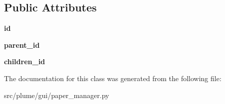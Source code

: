 \subsection*{Public Attributes}
\begin{DoxyCompactItemize}
\item 
{\bfseries id}\hypertarget{classplume-creator_1_1src_1_1plume_1_1gui_1_1paper__manager_1_1_paper_a4075a4f44aff907e2f92ce57873c46be}{}\label{classplume-creator_1_1src_1_1plume_1_1gui_1_1paper__manager_1_1_paper_a4075a4f44aff907e2f92ce57873c46be}

\item 
{\bfseries parent\+\_\+id}\hypertarget{classplume-creator_1_1src_1_1plume_1_1gui_1_1paper__manager_1_1_paper_a4eaa36b62ba7bc4abf53b98bbb61811d}{}\label{classplume-creator_1_1src_1_1plume_1_1gui_1_1paper__manager_1_1_paper_a4eaa36b62ba7bc4abf53b98bbb61811d}

\item 
{\bfseries children\+\_\+id}\hypertarget{classplume-creator_1_1src_1_1plume_1_1gui_1_1paper__manager_1_1_paper_a58dbd6ca850efc648f058fc351816932}{}\label{classplume-creator_1_1src_1_1plume_1_1gui_1_1paper__manager_1_1_paper_a58dbd6ca850efc648f058fc351816932}

\end{DoxyCompactItemize}


The documentation for this class was generated from the following file\+:\begin{DoxyCompactItemize}
\item 
src/plume/gui/paper\+\_\+manager.\+py\end{DoxyCompactItemize}
